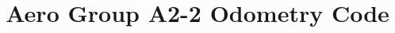 \documentclass{article}
\title{Aero Group A2-2 Odometry Code}
\makeatletter
\let\Title\@title
\makeatother
\begin{document}
    \begin{center}
        \Large \textbf{\Title} \\[0.8cm]
        \normalsize
    \end{center}

    \inputminted[linenos]{cpp}{./Odometry/Odometry.ino}
    
\end{document}

